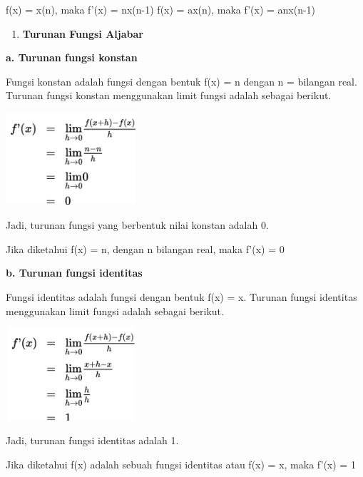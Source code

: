\documentclass[11pt,fleqn]{book} %
\begin{document}
\noindent 
f(x) = x(n), maka f'(x) = nx(n-1)
f(x) = ax(n), maka f'(x) = anx(n-1)


\noindent
\begin{enumerate}
\item \textbf{Turunan Fungsi Aljabar}
\end{enumerate}

\noindent 
\noindent \textbf{a. Turunan fungsi konstan}

\noindent 
Fungsi konstan adalah fungsi dengan bentuk f(x) = n dengan n = bilangan real. Turunan fungsi konstan menggunakan limit fungsi adalah sebagai berikut.

\noindent 
\begin{center}
\includegraphics*[width=1.90in, height=1.35in]{Pictures/TurunanFungsi7.png}
\end{center}

\noindent 
Jadi, turunan fungsi yang berbentuk nilai konstan adalah 0.

\noindent 
Jika diketahui f(x) = n, dengan n bilangan real, maka f'(x) = 0\\

\noindent

\noindent 
\noindent \textbf{b. Turunan fungsi identitas}

\noindent 
Fungsi identitas adalah fungsi dengan bentuk f(x) = x. Turunan fungsi identitas menggunakan limit fungsi adalah sebagai berikut.

\noindent 
\begin{center}
\includegraphics*[width=1.90in, height=1.35in]{Pictures/TurunanFungsi8.png}
\end{center}

\noindent 
Jadi, turunan fungsi identitas adalah 1.

\noindent 
Jika diketahui f(x) adalah sebuah fungsi identitas atau f(x) = x, maka f'(x) = 1\\
\end{document}
